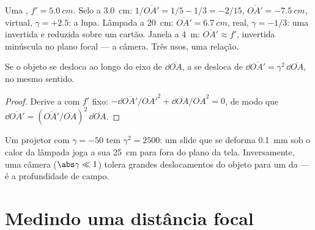 \begin{example}\label{ex:b1:mirrors-thin-lenses:lensuses}
Uma , $f' = \qty{5.0}{cm}$. Selo a \qty{3.0}{cm}:
$1/\overline{OA'} = 1/5 - 1/3 = -2/15$, $\overline{OA'} = \qty{-7.5}{cm}$,
virtual, $\gamma = +2.5$: a lupa. Lâmpada a \qty{20}{cm}:
$\overline{OA'} = \qty{6.7}{cm}$, real, $\gamma = -1/3$: uma 
invertida e reduzida sobre um cartão. Janela a \qty{4}{m}: $\overline{OA'}
\approx f'$,  invertida minúscula no plano focal --- a câmera.
Três usos, uma relação.
\end{example}

\begin{proposition}\label{prop:b1:mirrors-thin-lenses:longitudinal}
Se o objeto se desloca ao longo do eixo de $\dd\overline{OA}$, a 
se desloca de $\dd\overline{OA'} = \gamma^2\,\dd\overline{OA}$, no mesmo
sentido.
\end{proposition}

\begin{proof}
Derive a  com $f'$ fixo:
$-\dd\overline{OA'}/\overline{OA'}^2 + \dd\overline{OA}/\overline{OA}^2 = 0$,
de modo que $\dd\overline{OA'} = (\overline{OA'}/\overline{OA})^2\,\dd\overline{OA}$.
\end{proof}

\begin{remark}\label{rem:b1:mirrors-thin-lenses:depth}
Um projetor com $\gamma = -50$ tem $\gamma^2 = 2500$: um slide que
se deforma \qty{0.1}{mm} sob o calor da lâmpada joga a sua 
\qty{25}{cm} para fora do plano da tela. Inversamente, uma câmera ($\abs\gamma
\ll 1$) tolera grandes deslocamentos do objeto para um  da  ---
é a profundidade de campo.
\end{remark}

\section{Medindo uma distância focal}

